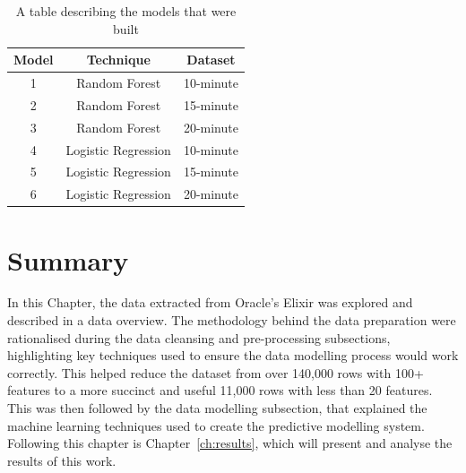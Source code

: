 \begin{table}[h!]
\centering
\caption{A table describing the models that were built}
\begin{tabular}{ c c c }
 \hline
 Model & Technique & Dataset \\ [0.5ex]
 \hline
 1 & Random Forest & 10-minute \\
 2 & Random Forest & 15-minute \\
 3 & Random Forest & 20-minute \\
 4 & Logistic Regression & 10-minute \\
 5 & Logistic Regression & 15-minute \\
 6 & Logistic Regression & 20-minute \\[1ex]
 \hline
\end{tabular}
\label{tab:ModelsBuilt}
\end{table}

\section{Summary}\label{sec:MethodSummary}
In this Chapter, the data extracted from Oracle's Elixir was explored and described in a data overview.
The methodology behind the data preparation were rationalised during the data cleansing and pre-processing subsections, highlighting key techniques used to ensure the data modelling process would work correctly.
This helped reduce the dataset from over 140,000 rows with 100+ features to a more succinct and useful 11,000 rows with less than 20 features.
This was then followed by the data modelling subsection, that explained the machine learning techniques used to create the predictive modelling system.
Following this chapter is Chapter~\ref{ch:results}, which will present and analyse the results of this work.

